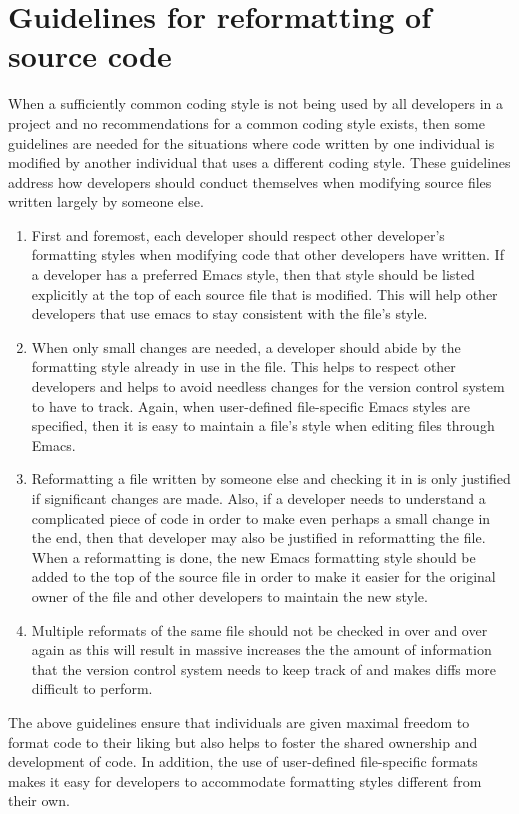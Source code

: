%
\section{Guidelines for reformatting of source code}
\label{sec:reformatting-guidelines}
%

When a sufficiently common coding style is not being used by all developers in
a project and no recommendations for a common coding style exists, then some
guidelines are needed for the situations where code written by one individual
is modified by another individual that uses a different coding style.  These
guidelines address how developers should conduct themselves when modifying
source files written largely by someone else.

\begin{enumerate}

{}\item First and foremost, each developer should respect other developer's
formatting styles when modifying code that other developers have written.  If
a developer has a preferred Emacs style, then that style should be listed
explicitly at the top of each source file that is modified.  This will help
other developers that use emacs to stay consistent with the file's style.

{}\item When only small changes are needed, a developer should abide by the
formatting style already in use in the file.  This helps to respect other
developers and helps to avoid needless changes for the version control system
to have to track.  Again, when user-defined file-specific Emacs styles are
specified, then it is easy to maintain a file's style when editing files
through Emacs.

{}\item Reformatting a file written by someone else and checking it in is only
justified if significant changes are made.  Also, if a developer needs to
understand a complicated piece of code in order to make even perhaps a small
change in the end, then that developer may also be justified in reformatting
the file.  When a reformatting is done, the new Emacs formatting style should
be added to the top of the source file in order to make it easier for the
original owner of the file and other developers to maintain the new style.

{}\item Multiple reformats of the same file should not be checked in over and
over again as this will result in massive increases the the amount of
information that the version control system needs to keep track of and makes
diffs more difficult to perform.

\end{enumerate}

The above guidelines ensure that individuals are given maximal freedom to
format code to their liking but also helps to foster the shared ownership and
development of code.  In addition, the use of user-defined file-specific
formats makes it easy for developers to accommodate formatting styles
different from their own.
